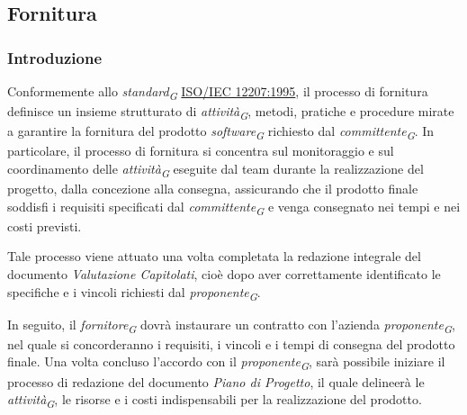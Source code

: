 \subsection{Fornitura}
\subsubsection{Introduzione}
Conformemente allo \textit{standard}\textsubscript{\textit{G}} \href{https://www.math.unipd.it/~tullio/IS-1/2009/Approfondimenti/ISO_12207-1995.pdf}{ISO/IEC 12207:1995}, il processo di fornitura definisce un insieme strutturato di \textit{attività}\textsubscript{\textit{G}}, metodi, pratiche e procedure mirate a garantire la fornitura del prodotto \textit{software}\textsubscript{\textit{G}} richiesto dal \textit{committente}\textsubscript{\textit{G}}. 
In particolare, il processo di fornitura si concentra sul monitoraggio e sul coordinamento delle \textit{attività}\textsubscript{\textit{G}} eseguite dal team durante la realizzazione del progetto, dalla concezione alla consegna, assicurando che il prodotto finale soddisfi i requisiti specificati dal \textit{committente}\textsubscript{\textit{G}} e venga consegnato nei tempi e nei costi previsti.

\vspace{0.2cm}

Tale processo viene attuato una volta completata la redazione integrale del documento \textit{Valutazione Capitolati}, cioè dopo aver correttamente identificato le specifiche e i vincoli richiesti dal \textit{proponente}\textsubscript{\textit{G}}.

\vspace{0.2cm}

In seguito, il \textit{fornitore}\textsubscript{\textit{G}} dovrà instaurare un contratto con l'azienda \textit{proponente}\textsubscript{\textit{G}}, nel quale si concorderanno i requisiti, i vincoli e i tempi di consegna del prodotto finale. Una volta concluso l'accordo con il \textit{proponente}\textsubscript{\textit{G}}, sarà possibile iniziare il processo di redazione del documento
\textit{Piano di Progetto}, il quale delineerà le \textit{attività}\textsubscript{\textit{G}}, le risorse e i costi indispensabili per la realizzazione del prodotto.

